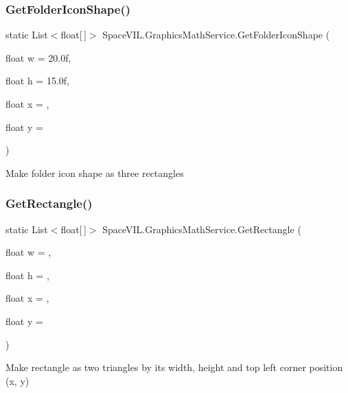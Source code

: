 \subsubsection{\texorpdfstring{Get\+Folder\+Icon\+Shape()}{GetFolderIconShape()}}
{\footnotesize\ttfamily static List$<$float\mbox{[}$\,$\mbox{]}$>$ Space\+V\+I\+L.\+Graphics\+Math\+Service.\+Get\+Folder\+Icon\+Shape (\begin{DoxyParamCaption}\item[{float}]{w = {\ttfamily 20.0f},  }\item[{float}]{h = {\ttfamily 15.0f},  }\item[{float}]{x = {},  }\item[{float}]{y = {} }\end{DoxyParamCaption})\hspace{0.3cm}{\ttfamily [static]}}



Make folder icon shape as three rectangles 

\mbox{\label{class_space_v_i_l_1_1_graphics_math_service_aa65cde8859be0b310d39c25e739521b0}} 
\subsubsection{\texorpdfstring{Get\+Rectangle()}{GetRectangle()}}
{\footnotesize\ttfamily static List$<$float\mbox{[}$\,$\mbox{]}$>$ Space\+V\+I\+L.\+Graphics\+Math\+Service.\+Get\+Rectangle (\begin{DoxyParamCaption}\item[{float}]{w = {},  }\item[{float}]{h = {},  }\item[{float}]{x = {},  }\item[{float}]{y = {} }\end{DoxyParamCaption})\hspace{0.3cm}{\ttfamily [static]}}



Make rectangle as two triangles by its width, height and top left corner position (x, y) 

\mbox{\label{class_space_v_i_l_1_1_graphics_math_service_a9674c1169184a3f66798b1f5324e252f}} 
